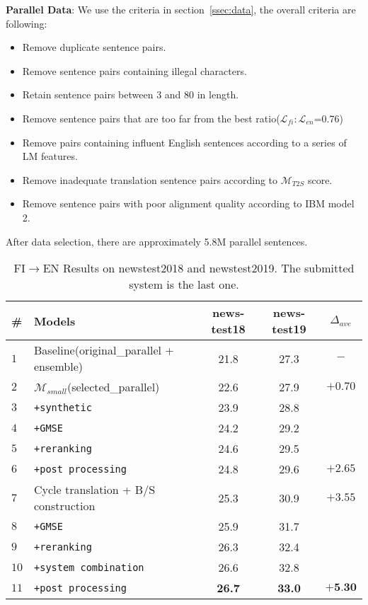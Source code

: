 \documentclass[11pt,a4paper]{article}
\begin{document}
\textbf{Parallel Data}:
We use the criteria in section~\ref{ssec:data}, the overall criteria are following:

\begin{itemize}
\item Remove duplicate sentence pairs.
\item Remove sentence pairs containing illegal characters.
\item Retain sentence pairs between 3 and 80 in length.
\item Remove sentence pairs that are too far from the best ratio($\mathcal{L}_{fi}:\mathcal{L}_{en}$=0.76)
\item Remove pairs containing influent English sentences according to a series of LM features.
\item Remove inadequate translation sentence pairs according to $\mathcal{M}_{T2S}$ score.
\item Remove sentence pairs with poor alignment quality according to IBM model 2.
\end{itemize}

After data selection, there are approximately 5.8M parallel sentences.\\


\begin{table*}[hbt]
    \begin{center}
    \begin{tabular}{l|l|c|c|c}
    \hline
    \textbf{\#} & \textbf{Models} & news-test18 & news-test19 & $\Delta_{ave}$\\ 
    \hline
    $1$ & Baseline\small{(original\_parallel + ensemble)} & 21.8 & 27.3 & $-$ \\
    \hline
    $2$ & $\mathcal{M}_{small}$\small{(selected\_parallel)} & 22.6 & 27.9 & $+0.70$ \\
    \hline
    $3$ & \verb|+synthetic| & 23.9 & 28.8 & \\
    $4$ & \verb|+GMSE| & 24.2 & 29.2 & \\
    $5$ & \verb|+reranking| & 24.6 & 29.5 & \\
    $6$ & \verb|+post processing| & 24.8 & 29.6 & $+2.65$\\
    \hline
    $7$ & Cycle translation + B/S construction & 25.3 & 30.9 & $+3.55$ \\
    \hline
    $8$ & \verb|+GMSE| & 25.9 & 31.7 & \\
    $9$ & \verb|+reranking| & 26.3 & 32.4 & \\
    $10$ & \verb|+system combination| & 26.6 & 32.8 & \\
    \rowcolor{mypink}
    $11$ & \verb|+post processing| & \textbf{26.7} & \textbf{33.0} & $\textbf{+5.30}$\\
    \hline
    \end{tabular}
    \end{center}
    \caption{\label{tab:result}FI$\rightarrow$EN Results on newstest2018 and newstest2019. The submitted system is the last one.}
\end{table*}
\end{document}
